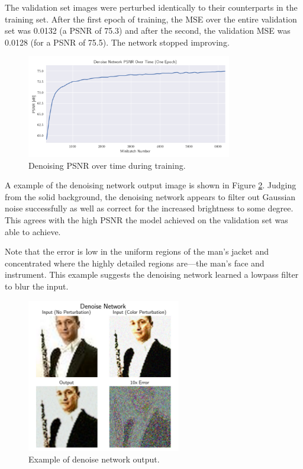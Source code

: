 \documentclass[justified]{article}
\begin{document}
  The validation set images were perturbed identically to their counterparts in the training set.
  After the first epoch of training, the MSE over the entire validation set was 0.0132 (a PSNR of 75.3) and after the second, the validation MSE was 0.0128 (for a PSNR of 75.5).
  The network stopped improving.

  \begin{figure}[H]
    \centering
    \includegraphics[width=0.8\textwidth]{figures/denoise-psnr}
    \caption{Denoising PSNR over time during training.}
    \label{fig:denoise-psnr}
  \end{figure}

  A example of the denoising network output image is shown in Figure \ref{eq:denoise-example}.
  Judging from the solid background, the denoising network appears to filter out Gaussian noise successfully as well as correct for the increased brightness to some degree.
  This agrees with the high PSNR the model achieved on the validation set was able to achieve.

  Note that the error is low in the uniform regions of the man's jacket and concentrated where the highly detailed regions are---the man's face and instrument.
  This example suggests the denoising network learned a lowpass filter to blur the input.

  \begin{figure}[H]
    \centering
    \includegraphics[width=0.6\textwidth]{figures/denoise.png}
    \caption{
      Example of denoise network output.
    }
    \label{eq:denoise-example}
  \end{figure}
\end{document}
